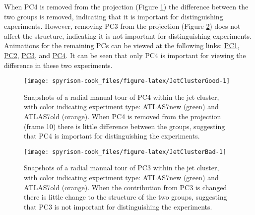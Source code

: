 When PC4 is removed from the projection (Figure
\ref{fig:JetClusterGood}) the difference between the two groups is
removed, indicating that it is important for distinguishing experiments.
However, removing PC3 from the projection (Figure
\ref{fig:JetClusterBad}) does not affect the structure, indicating it is
not important for distinguishing experiments. Animations for the
remaining PCs can be viewed at the following links:
\href{https://github.com/nspyrison/spinifex_paper/blob/master/paper/gifs/jetcluster_manualtour_pc1.gif}{PC1},
\href{https://github.com/nspyrison/spinifex_paper/blob/master/paper/gifs/jetcluster_manualtour_pc2.gif}{PC2},
\href{https://github.com/nspyrison/spinifex_paper/blob/master/paper/gifs/jetcluster_manualtour_pc3.gif}{PC3},
and
\href{https://github.com/nspyrison/spinifex_paper/blob/master/paper/gifs/jetcluster_manualtour_pc4.gif}{PC4}.
It can be seen that only PC4 is important for viewing the difference in
these two experiments.

\begin{Schunk}
\begin{figure}

{\centering \texttt{[image: spyrison-cook\_files/figure-latex/JetClusterGood-1]} 

}

\caption[Snapshots of a radial manual tour of PC4 within the jet cluster, with color indicating experiment type]{Snapshots of a radial manual tour of PC4 within the jet cluster, with color indicating experiment type: ATLAS7new (green) and ATLAS7old (orange). When PC4 is removed from the projection (frame 10) there is little difference between the groups, suggesting that PC4 is important for distinguishing the experiments.}\label{fig:JetClusterGood}
\end{figure}
\end{Schunk}

\begin{Schunk}
\begin{figure}

{\centering \texttt{[image: spyrison-cook\_files/figure-latex/JetClusterBad-1]} 

}

\caption[Snapshots of a radial manual tour of PC3 within the jet cluster, with color indicating experiment type]{Snapshots of a radial manual tour of PC3 within the jet cluster, with color indicating experiment type: ATLAS7new (green) and ATLAS7old (orange).  When the contribution from PC3 is changed there is little change to the structure of the two groups, suggesting that PC3 is not important for distinguishing the experiments.}\label{fig:JetClusterBad}
\end{figure}
\end{Schunk}

